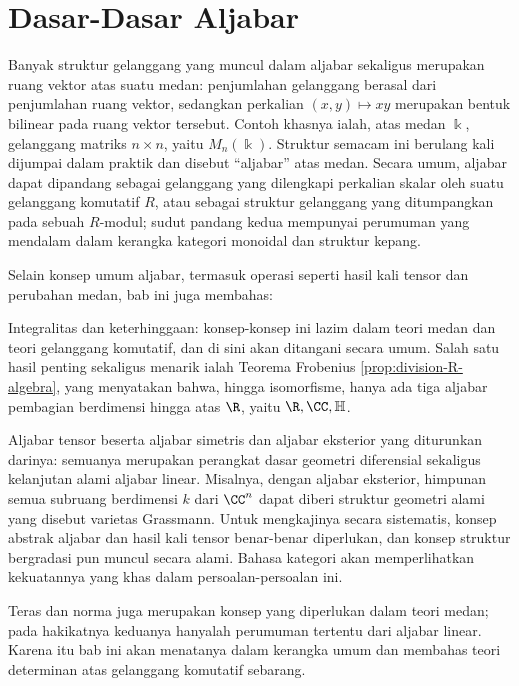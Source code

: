 
\chapter{Dasar-Dasar Aljabar}\label{sec:algebras}
Banyak struktur gelanggang yang muncul dalam aljabar sekaligus merupakan ruang vektor atas suatu medan: penjumlahan gelanggang berasal dari penjumlahan ruang vektor, sedangkan perkalian $(x,y) \mapsto xy$ merupakan bentuk bilinear pada ruang vektor tersebut. Contoh khasnya ialah, atas medan $\Bbbk$, gelanggang matriks $n \times n$, yaitu $M_n(\Bbbk)$. Struktur semacam ini berulang kali dijumpai dalam praktik dan disebut ``aljabar'' atas medan. Secara umum, aljabar dapat dipandang sebagai gelanggang yang dilengkapi perkalian skalar oleh suatu gelanggang komutatif $R$, atau sebagai struktur gelanggang yang ditumpangkan pada sebuah $R$-modul; sudut pandang kedua mempunyai perumuman yang mendalam dalam kerangka kategori monoidal dan struktur kepang.

Selain konsep umum aljabar, termasuk operasi seperti hasil kali tensor dan perubahan medan, bab ini juga membahas:
\begin{compactenum}
	\item Integralitas dan keterhinggaan: konsep-konsep ini lazim dalam teori medan dan teori gelanggang komutatif, dan di sini akan ditangani secara umum. Salah satu hasil penting sekaligus menarik ialah Teorema Frobenius \ref{prop:division-R-algebra}, yang menyatakan bahwa, hingga isomorfisme, hanya ada tiga aljabar pembagian berdimensi hingga atas $\R$, yaitu $\R, \CC, \mathbb{H}$.
	\item Aljabar tensor beserta aljabar simetris dan aljabar eksterior yang diturunkan darinya: semuanya merupakan perangkat dasar geometri diferensial sekaligus kelanjutan alami aljabar linear. Misalnya, dengan aljabar eksterior, himpunan semua subruang berdimensi $k$ dari $\CC^n$ dapat diberi struktur geometri alami yang disebut varietas Grassmann. Untuk mengkajinya secara sistematis, konsep abstrak aljabar dan hasil kali tensor benar-benar diperlukan, dan konsep struktur bergradasi pun muncul secara alami. Bahasa kategori akan memperlihatkan kekuatannya yang khas dalam persoalan-persoalan ini.
	\item Teras dan norma juga merupakan konsep yang diperlukan dalam teori medan; pada hakikatnya keduanya hanyalah perumuman tertentu dari aljabar linear. Karena itu bab ini akan menatanya dalam kerangka umum dan membahas teori determinan atas gelanggang komutatif sebarang.
\end{compactenum}

